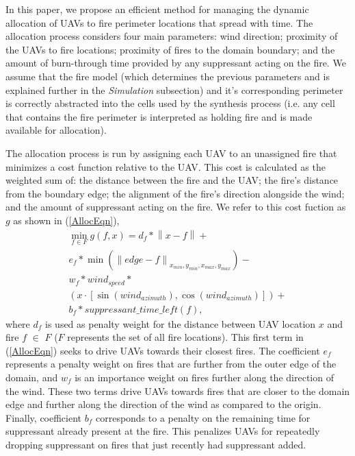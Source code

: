 \documentclass{ieeeaccess}
\newcommand{\norm}[1]{\left\lVert#1\right\rVert}
\begin{document}
In this paper, we propose an efficient method for managing the dynamic allocation of UAVs to fire perimeter locations that spread with time. The allocation process considers four main parameters: wind direction; proximity of the UAVs to fire locations; proximity of fires to the domain boundary; and the amount of burn-through time provided by any suppressant acting on the fire. We assume that the fire model (which determines the previous parameters and is explained further in the \textit{Simulation} subsection) and it's corresponding perimeter is correctly abstracted into the cells used by the synthesis process (i.e. any cell that contains the fire perimeter is interpreted as holding fire and is made available for allocation).

The allocation process is run by assigning each UAV to an unassigned fire that minimizes a cost function relative to the UAV. This cost is calculated as the weighted sum of: the distance between the fire and the UAV; the fire's distance from the boundary edge; the alignment of the fire's direction alongside the wind; and the amount of suppressant acting on the fire. We refer to this cost fuction as $g$ as shown in (\ref{AllocEqn}),
\begin{equation}
\label{AllocEqn}
\begin{aligned}
\min_{f\in F} g(f,x) = d_{f}*\norm{x-f} + \\ e_f*\min(\norm{edge - f}_{x_{min}, y_{min}, x_{max}, y_{max}}) - \\ w_f*wind_{speed}* \\ (x \cdot [\sin(wind_{azimuth}), \cos(wind_{azimuth})])+\\ b_f*suppressant\_time\_left(f),
\end{aligned}
\end{equation}
where $d_{f}$ is used as penalty weight for the distance between UAV location $x$ and fire $f$ $\in$ $F$ ($F$ represents the set of all fire locations). This first term in (\ref{AllocEqn}) seeks to drive UAVs towards their closest fires. The coefficient $e_f$ represents a penalty weight on fires that are further from the outer edge of the domain, and $w_f$ is an importance weight on fires further along the direction of the wind. These two terms drive UAVs towards fires that are closer to the domain edge and further along the direction of the wind as compared to the origin. Finally, coefficient $b_{f}$ corresponds to a penalty on the remaining time for suppressant already present at the fire. This penalizes UAVs for repeatedly dropping suppressant on fires that just recently had suppressant added.
\end{document}
